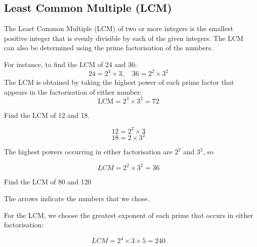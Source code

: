 \subsection*{Least Common Multiple (LCM)}
The Least Common Multiple (LCM) of two or more integers is the smallest positive integer that is evenly divisible by each of the given integers. The LCM can also be determined using the prime factorisation of the numbers. 

For instance, to find the LCM of 24 and 36:
\[
24 = 2^3 \times 3, \quad 36 = 2^2 \times 3^2
\]
The LCM is obtained by taking the highest power of each prime factor that appears in the factorisation of either number:
\[
\text{LCM} = 2^3 \times 3^2 = 72
\]

\begin{example} Find the LCM of 12 and 18.

\begin{solution}
\[
12 = 2^2\times 3
\]
\[
18 = 2 \times 3^2
\]

The highest powers occurring in either factorisation are $2^2$ and $3^2$, so

\[
LCM = 2^2 \times 3^2 = 36
\]
    
\end{solution}
    
\end{example}

\begin{example} Find the LCM of 80 and 120

\begin{solution}
    

The arrows indicate the numbers that we chose.


For the LCM, we choose the greatest exponent of each prime that occurs in either factorisation:

\[
LCM = 2^4\times 3 \times 5 = 240
\]
\end{solution}

\end{example}


